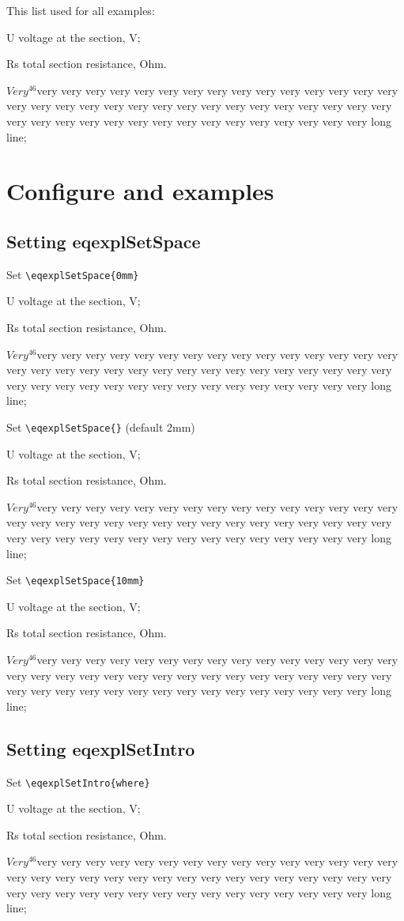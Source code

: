 \documentclass{article}
\begin{document}
\newcommand{\testList}{
\item{U} voltage at the section, V;
\item{Rs} total section resistance, Ohm.
\item{$Very^{46}$}very very very very very very very very very very very
  very very very very very very very very very very very very very
  very very very very very very very very very very very very very
  very very very very very very very very very long line;
}

This list used for all examples:
\begin{eqexpl}
  \testList
\end{eqexpl}

\section{Configure and examples}

\subsection{Setting eqexplSetSpace}

\noindent Set \verb+\eqexplSetSpace{0mm}+

\eqexplSetSpace{0mm}
\begin{eqexpl}
  \testList
\end{eqexpl}

\vspace{5mm}

\noindent Set \verb+\eqexplSetSpace{}+ (default 2mm)

\eqexplSetSpace{}
\begin{eqexpl}
  \testList
\end{eqexpl}

\vspace{5mm}

\noindent Set \verb+\eqexplSetSpace{10mm}+

\eqexplSetSpace{10mm}
\begin{eqexpl}
  \testList
\end{eqexpl}

\eqexplSetSpace{}

\subsection{Setting eqexplSetIntro}

\noindent Set \verb+\eqexplSetIntro{where}+

\begin{eqexpl}
  \testList
\end{eqexpl}
\end{document}
